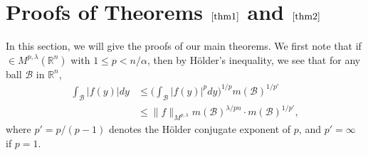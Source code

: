\documentclass[10pt, reqno]{amsart}
\theoremstyle{definition}
\theoremstyle{remark}
\numberwithin{equation}{section}
\begin{document}
\section{Proofs of Theorems $\ref{thm1}$ and $\ref{thm2}$}
In this section, we will give the proofs of our main theorems. We first note that if $\in{M}^{p,\lambda}(\mathbb R^n)$ with $1\leq p<n/{\alpha}$, then by H\"{o}lder's inequality, we see that for any ball $\mathcal{B}$ in $\mathbb R^n$,
\begin{equation}\label{oftenused}
\begin{split}
\int_{\mathcal{B}}|f(y)|dy
&\leq\bigg(\int_{\mathcal{B}}|f(y)|^pdy\bigg)^{1/p}m(\mathcal{B})^{1/{p'}}\\
&\leq\big\|f\big\|_{M^{p,\lambda}}m(\mathcal{B})^{\lambda/{pn}}\cdot m(\mathcal{B})^{1/{p'}},
\end{split}
\end{equation}
where $p'=p/{(p-1)}$ denotes the H\"{o}lder conjugate exponent of $p$, and $p'=\infty$ if $p=1$.
\end{document}
